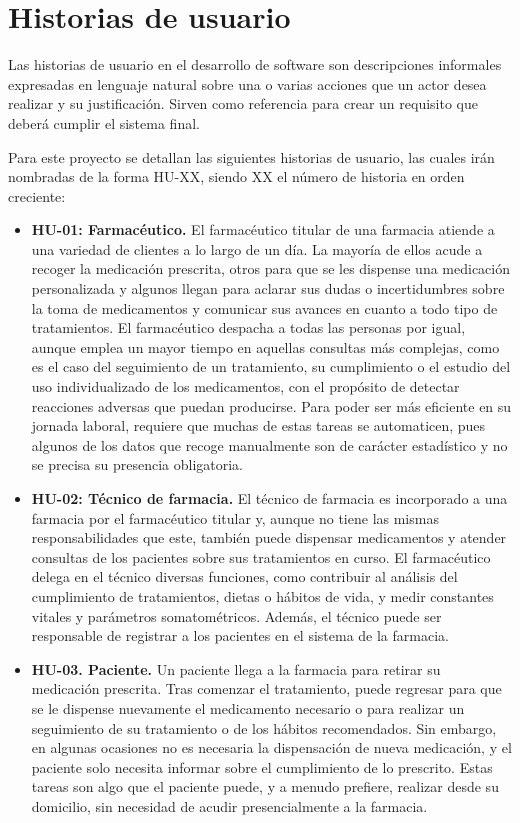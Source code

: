 \section{Historias de usuario}
Las historias de usuario en el desarrollo de software son descripciones informales expresadas en lenguaje natural sobre una o varias acciones que un actor desea realizar y su justificación. Sirven como referencia para crear un requisito que deberá cumplir el sistema final. 

Para este proyecto se detallan las siguientes historias de usuario, las cuales irán nombradas de la forma HU-XX, siendo XX el número de historia en orden creciente:

\begin{itemize}
	\item \textbf{HU-01: Farmacéutico.} El farmacéutico titular de una farmacia atiende a una variedad de clientes a lo largo de un día. La mayoría de ellos acude a recoger la medicación prescrita, otros para que se les dispense una medicación personalizada y algunos llegan para aclarar sus dudas o incertidumbres sobre la toma de medicamentos y comunicar sus avances en cuanto a todo tipo de tratamientos. El farmacéutico despacha a todas las personas por igual, aunque emplea un mayor tiempo en aquellas consultas más complejas, como es el caso del seguimiento de un tratamiento, su cumplimiento o el estudio del uso individualizado de los medicamentos, con el propósito de detectar reacciones adversas que puedan producirse. Para poder ser más eficiente en su jornada laboral, requiere que muchas de estas tareas se automaticen, pues algunos de los datos que recoge manualmente son de carácter estadístico y no se precisa su presencia obligatoria.
	
	\item \textbf{HU-02: Técnico de farmacia.} El técnico de farmacia es incorporado a una farmacia por el farmacéutico titular y, aunque no tiene las mismas responsabilidades que este, también puede dispensar medicamentos y atender consultas de los pacientes sobre sus tratamientos en curso. El farmacéutico delega en el técnico diversas funciones, como contribuir al análisis del cumplimiento de tratamientos, dietas o hábitos de vida, y medir constantes vitales y parámetros somatométricos. Además, el técnico puede ser responsable de registrar a los pacientes en el sistema de la farmacia.
	
	\item \textbf{HU-03. Paciente.} Un paciente llega a la farmacia para retirar su medicación prescrita. Tras comenzar el tratamiento, puede regresar para que se le dispense nuevamente el medicamento necesario o para realizar un seguimiento de su tratamiento o de los hábitos recomendados. Sin embargo, en algunas ocasiones no es necesaria la dispensación de nueva medicación, y el paciente solo necesita informar sobre el cumplimiento de lo prescrito. Estas tareas son algo que el paciente puede, y a menudo prefiere, realizar desde su domicilio, sin necesidad de acudir presencialmente a la farmacia.
	

\end{itemize}

